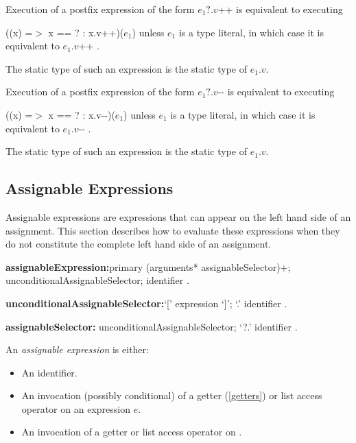 \documentclass{article}
\newcommand{\code}[1]{{\sf #1}}
\begin{document}
\begin{itemize}
\LMHash{}
Execution of a postfix expression of the form \code{$e_1?.v$++} is equivalent to executing

\code{((x) =$>$ x == \NULL? \NULL : x.v++)($e_1$)}
unless $e_1$ is a type literal, in which case it is equivalent to \code{$e_1.v$++}
.

\LMHash{}
The static type of such an expression is the static type of $e_1.v$.

\LMHash{}
Execution of a postfix expression of the form \code{$e_1?.v$-{}-} is equivalent to executing

\code{((x) =$>$ x == \NULL? \NULL : x.v-{}-)($e_1$)}
unless $e_1$ is a type literal, in which case it is equivalent to \code{$e_1.v$-{}-}
.

\LMHash{}
The static type of such an expression is the static type of $e_1.v$.


\subsection{ Assignable Expressions}

\LMHash{}
Assignable expressions are expressions that can appear on the left hand side of an assignment.
This section describes how to evaluate these expressions when they do not constitute the complete left hand side of an assignment.




\begin{grammar}

{\bf assignableExpression:}primary (arguments* assignableSelector)+;
      \SUPER{} unconditionalAssignableSelector;
      identifier
    .

{\bf unconditionalAssignableSelector:}`[' expression `]'; %
         `{\escapegrammar .}' identifier
    .

{\bf assignableSelector:}
         unconditionalAssignableSelector;
         `{\escapegrammar ?.}' identifier
    .

\end{grammar}


\LMHash{}
An {\em assignable expression} is either:
\begin{itemize}
 \item An identifier.
\item An invocation (possibly conditional) of a getter (\ref{getters}) or list access operator on an expression $e$.
\item An invocation of a getter or list access operator on  \SUPER{}.
\end{itemize}



\end{itemize}
\end{document}
